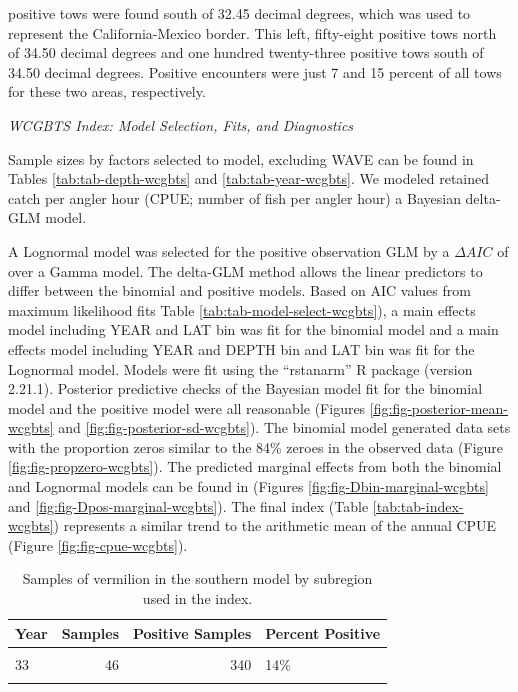 \documentclass[11pt,
  english,
  a4paper,
]{article}
\begin{document}
positive tows were found south of 32.45 decimal degrees, which was used to represent the California-Mexico border. This left, fifty-eight positive tows north of 34.50 decimal degrees and one hundred twenty-three positive tows south of 34.50 decimal degrees. Positive encounters were just 7 and 15 percent of all tows for these two areas, respectively.

\emph{WCGBTS Index: Model Selection, Fits, and Diagnostics}

Sample sizes by factors selected to model, excluding WAVE can be found in Tables \ref{tab:tab-depth-wcgbts} and \ref{tab:tab-year-wcgbts}. We modeled retained catch per angler hour (CPUE; number of fish per angler hour) a Bayesian delta-GLM model.

A Lognormal model was selected for the positive observation GLM by a {\(\Delta AIC\)\leavevmode\tagmcend\tagstructend} of\\
over a Gamma model. The delta-GLM method allows the linear predictors to differ between the binomial and positive models. Based on AIC values from maximum likelihood fits Table \ref{tab:tab-model-select-wcgbts}), a main effects model including YEAR and LAT bin was fit for the binomial model and a main effects model including YEAR and DEPTH bin and LAT bin was fit for the Lognormal model. Models were fit using the ``rstanarm'' R package (version 2.21.1). Posterior predictive checks of the Bayesian model fit for the binomial model and the positive model were all reasonable (Figures \ref{fig:fig-posterior-mean-wcgbts} and \ref{fig:fig-posterior-sd-wcgbts}). The binomial model generated data sets with the proportion zeros similar to the 84\% zeroes in the observed data (Figure \ref{fig:fig-propzero-wcgbts}). The predicted marginal effects from both the binomial and Lognormal models can be found in (Figures \ref{fig:fig-Dbin-marginal-wcgbts} and \ref{fig:fig-Dpos-marginal-wcgbts}). The final index (Table \ref{tab:tab-index-wcgbts}) represents a similar trend to the arithmetic mean of the annual CPUE (Figure \ref{fig:fig-cpue-wcgbts}).

\newpage

\begin{table}

\caption{\label{tab:tab-region-wcgbts}Samples of vermilion in the southern model by subregion used in the index.}
\centering
\begin{tabular}[t]{lrrl}
\toprule
Year & Samples & Positive Samples & Percent Positive\\
\midrule
\cellcolor{gray!6}{32} & \cellcolor{gray!6}{14} & \cellcolor{gray!6}{64} & \cellcolor{gray!6}{22\%}\\
33 & 46 & 340 & 14\%\\
\cellcolor{gray!6}{34} & \cellcolor{gray!6}{58} & \cellcolor{gray!6}{339} & \cellcolor{gray!6}{17\%}\\
\bottomrule
\end{tabular}
\end{table}
\end{document}
